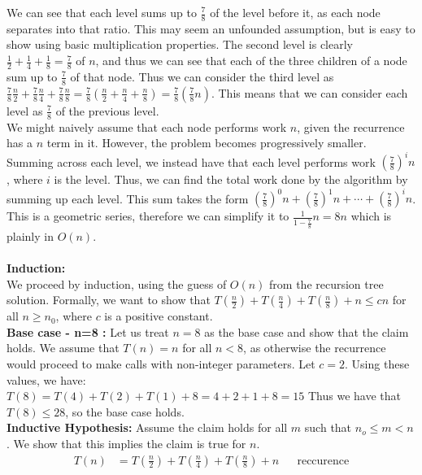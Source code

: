\documentclass{article}
\begin{document}
\begin{enumerate}
\begin{enumerate}
\begin{center}
\end{center}
We can see that each level sums up to $\frac{7}{8}$ of the level before it, as each node separates into that ratio. This may seem an unfounded assumption, but is easy to show using basic multiplication properties. The second level is clearly $\frac{1}{2}+\frac{1}{4}+\frac{1}{8}=\frac{7}{8}$ of $n$, and thus we can see that each of the three children of a node sum up to $\frac{7}{8}$ of that node. Thus we can consider the third level as $\frac{7}{8}\frac{n}{2}+\frac{7}{8}\frac{n}{4}+\frac{7}{8}\frac{n}{8}=\frac{7}{8}(\frac{n}{2}+\frac{n}{4}+\frac{n}{8})=\frac{7}{8}(\frac{7}{8}n)$. This means that we can consider each level as $\frac{7}{8}$ of the previous level.
\\We might naively assume that each node performs work $n$, given the recurrence has a $n$ term in it. However, the problem becomes progressively smaller. Summing across each level, we instead have that each level performs work $(\frac{7}{8})^in$, where $i$ is the level. Thus, we can find the total work done by the algorithm by summing up each level. This sum takes the form $(\frac{7}{8})^0n + (\frac{7}{8})^1n + \cdots + (\frac{7}{8})^in$. This is a geometric series, therefore we can simplify it to $\frac{1}{1-\frac{7}{8}}n = 8n$ which is plainly in $O(n)$.
	\\ \\ \textbf{Induction:}
\\ We proceed by induction, using the guess of $O(n)$ from the recursion tree solution. Formally, we want to show that $T(\frac{n}{2})+T(\frac{n}{4})+T(\frac{n}{8})+n \leq c n$ for all $n \geq n_0$, where $c$ is a positive constant. 
\\ \textbf{Base case - n=8 :}
Let us treat $n=8$ as the base case and show that the claim holds. We assume that $T(n)=n$ for all $n<8$, as otherwise the recurrence would proceed to make calls with non-integer parameters. Let $c=2$. Using these values, we have:
\\ $T(8) = T(4)+T(2)+T(1)+8 = 4+2+1+8=15$
Thus we have that $T(8) \leq 2 8$, so the base case holds.
\\ \textbf{Inductive Hypothesis:} Assume the claim holds for all $m$ such that $n_o \leq m < n$. We show that this implies the claim is true for $n$.
\begin{align}
	T(n)&=T(\frac{n}{2})+T(\frac{n}{4})+T(\frac{n}{8})+n && \text{reccurence} \\

\end{align}
\end{enumerate}
\end{enumerate}
\end{document}
